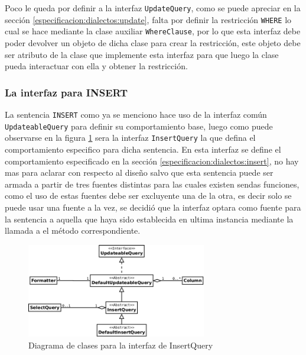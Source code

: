Poco le queda por definir a la interfaz \verb=UpdateQuery=, como se puede apreciar en la sección \ref{especificacion:dialectos:update}, falta por definir la restricción \verb=WHERE= lo cual se hace mediante la clase auxiliar \verb=WhereClause=, por lo que esta interfaz debe poder devolver un objeto de dicha clase para crear la restricción, este objeto debe ser atributo de la clase que implemente esta interfaz para que luego la clase pueda interactuar con ella y obtener la restricción. 
%
\subsubsection{La interfaz para INSERT}
La sentencia \verb=INSERT= como ya se menciono hace uso de la interfaz común \verb=UpdateableQuery= para definir su comportamiento base, luego como puede observarse en la figura \ref{fig:dc-insertquery} sera la interfaz \verb=InsertQuery= la que defina el comportamiento especifico para dicha sentencia. En esta interfaz se define el comportamiento especificado en la sección \ref{especificacion:dialectos:insert}, no hay mas para aclarar con respecto al diseño salvo que esta sentencia puede ser armada a partir de tres fuentes distintas para las cuales existen sendas funciones, como el uso de estas fuentes debe ser excluyente una de la otra, es decir solo se puede usar una fuente a la vez, se decidió que la interfaz optara como fuente para la sentencia a aquella que haya sido establecida en ultima instancia mediante la llamada a el método correspondiente.
%
\begin{figure}[h]
  \centering
    \includegraphics[width=0.7\textwidth]{figuras/jdbgm-dc-insert.png}
  \caption{Diagrama de clases para la interfaz de InsertQuery}
  \label{fig:dc-insertquery}
\end{figure}
%
